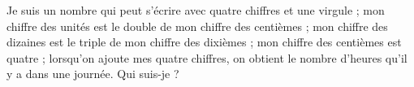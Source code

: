 \begin{exercice}
    Je suis un nombre qui peut s'écrire avec quatre chiffres et une virgule ; mon chiffre des unités est le double de mon chiffre des centièmes ; mon chiffre des dizaines est le triple de mon chiffre des dixièmes ; mon chiffre des centièmes est quatre ; lorsqu'on ajoute mes quatre chiffres, on obtient le nombre d'heures qu'il y a dans une journée. Qui suis-je ?
 \end{exercice}